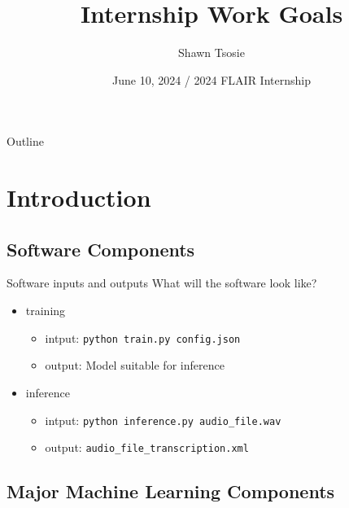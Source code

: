\documentclass{beamer}
\title[Internship Goals] %
{Internship Work Goals}
\subtitle
{} %
\author %
{Shawn Tsosie\inst{1}}
\institute[FLAIR] %
{
  Applied Machine Learning, \\
  First Languages AI Reality}
\date %
{June 10, 2024 / 2024 FLAIR Internship}
\begin{document}
\begin{frame}
  \titlepage
\end{frame}

\begin{frame}{Outline}
  \tableofcontents
\end{frame}




\section{Introduction}

\subsection{Software Components}

\begin{frame}{Software inputs and outputs}
  What will the software look like?
  \begin{itemize}
  \item
    training
    \begin{itemize}
    \item
    intput: \texttt{python train.py config.json}
    \item
    output: Model suitable for inference
    \end{itemize}
  \item
  inference
    \begin{itemize}
    \item
    intput: \texttt{python inference.py audio\_file.wav}
    \item
    output: \texttt{audio\_file\_transcription.xml}
    \end{itemize}
  \end{itemize}
\end{frame}

\subsection[Machine Learning Breakdown]{Major Machine Learning Components}
\end{document}
